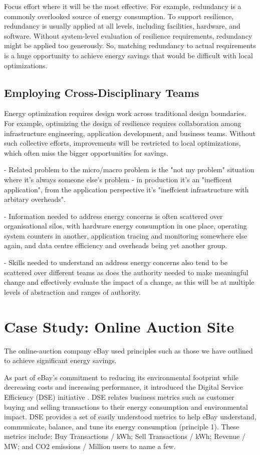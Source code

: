 Focus effort where it will be the most effective. For example, redundancy is a commonly overlooked source of energy consumption. To support resilience, redundancy is usually applied at all levels, including facilities, hardware, and software. Without system-level evaluation of resilience requirements, redundancy might be applied too generously. So, matching redundancy to actual requirements is a huge opportunity to achieve energy savings that would be difficult with local optimizations.


\subsection{Employing Cross-Disciplinary Teams}

Energy optimization requires design work across traditional design boundaries. For example, optimizing the design of resilience requires collaboration among infrastructure engineering, application development, and business teams. Without such collective efforts, improvements will be restricted to local optimizations, which often miss the bigger opportunities for savings.

- Related problem to the micro/macro problem is the "not my problem" situation where it's always someone else's problem - in production it's an "inefficent application", from the application perspective it's "ineffcient infrastructure with arbitary overheads".

- Information needed to address energy concerns is often scattered over organisational silos, with hardware energy consumption in one place, operating system counters in another, application tracing and monitoring somewhere else again, and data centre efficiency and overheads being yet another group.

- Skills needed to understand an address energy concerns also tend to be scattered over different teams as does the authority needed to make meaningful change and effectively evaluate the impact of a change, as this will be at multiple levels of abstraction and ranges of authority.

\section{Case Study: Online Auction Site}

The online-auction company eBay used principles such as those we have outlined to achieve significant energy savings.

As part of eBay's commitment to reducing its environmental footprint while decreasing costs and increasing performance, it introduced the Digital Service Efficiency (DSE) initiative \cite{ebay2013-digitalefficiency}. DSE relates business metrics such as customer buying and selling transactions to their energy consumption and environmental impact. DSE provides a set of easily understood metrics to help eBay understand, communicate, balance, and tune its energy consumption (principle 1). These metrics include: Buy Transactions / kWh; Sell Transactions / kWh; Revenue / MW; and CO2 emissions / Million users to name a few.

